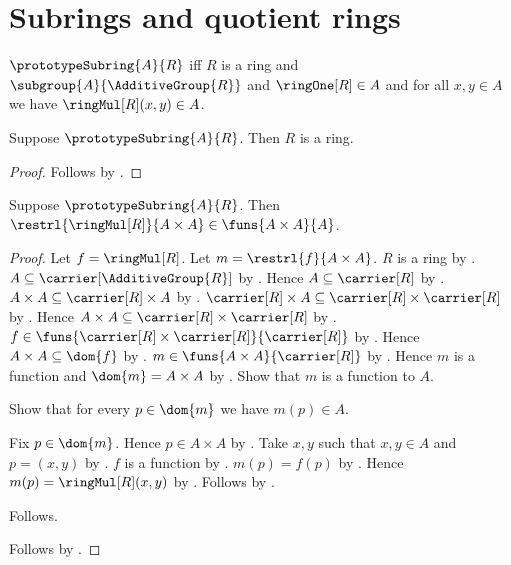 




\section{Subrings and quotient rings}

\begin{definition}\label{spike_prototype_subring}
    $\prototypeSubring{A}{R}$ iff
        $R$ is a ring and
        $\subgroup{A}{\AdditiveGroup{R}}$ and
        $\ringOne[R]\in A$ and
        for all $x,y\in A$ we have $\ringMul[R](x,y)\in A$.
\end{definition}

\begin{proposition}\label{spike_subring_ring_guard}
    Suppose $\prototypeSubring{A}{R}$.
    Then $R$ is a ring.
\end{proposition}
\begin{proof}
    Follows by .
\end{proof}

\begin{proposition}\label{spike_subring_mul_restriction_type}
    Suppose $\prototypeSubring{A}{R}$.
    Then
        $\restrl{\ringMul[R]}{A\times A}\in\funs{A\times A}{A}$.
\end{proposition}
\begin{proof}
    Let $f=\ringMul[R]$.
    Let $m=\restrl{f}{A\times A}$.
    $R$ is a ring by .
    $A\subseteq\carrier[\AdditiveGroup{R}]$ by
        .
    Hence $A\subseteq\carrier[R]$ by
        .
    $A\times A\subseteq\carrier[R]\times A$ by
        .
    $\carrier[R]\times A
        \subseteq\carrier[R]\times\carrier[R]$ by
        .
    Hence $A\times A\subseteq\carrier[R]\times\carrier[R]$ by
        .
    $f\in\funs{\carrier[R]\times\carrier[R]}{\carrier[R]}$ by
        .
    Hence $A\times A\subseteq\dom{f}$ by .
    $m\in\funs{A\times A}{\carrier[R]}$ by .
    Hence $m$ is a function and $\dom{m}=A\times A$ by
        .
    Show that $m$ is a function to $A$.
    \begin{subproof}
        Show that for every $p\in\dom{m}$ we have $m(p)\in A$.
        \begin{subproof}
            Fix $p\in\dom{m}$.
            Hence $p\in A\times A$ by \auto.
            Take $x,y$ such that $x,y\in A$ and $p=(x,y)$ by
                .
            $f$ is a function by .
            $m(p)=f(p)$ by .
            Hence $m(p)=\ringMul[R](x,y)$ by \auto.
            Follows by .
        \end{subproof}
        Follows.
    \end{subproof}
    Follows by .
\end{proof}

